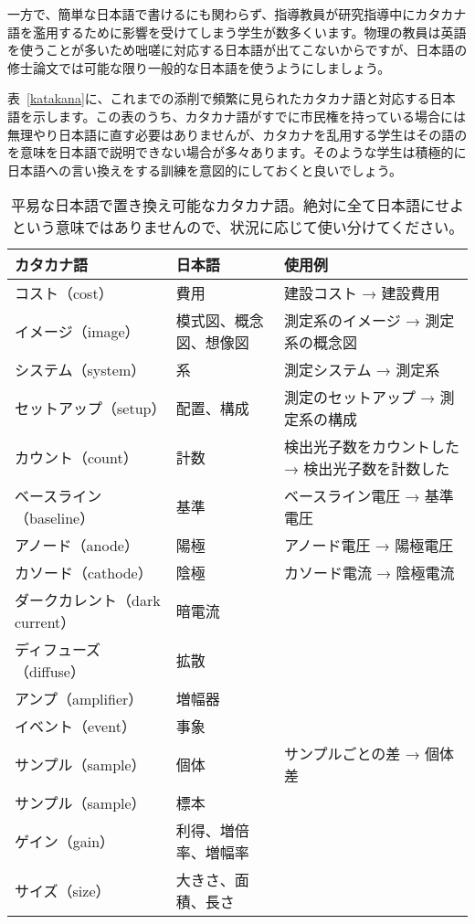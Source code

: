 一方で、簡単な日本語で書けるにも関わらず、指導教員が研究指導中にカタカナ語を濫用するために影響を受けてしまう学生が数多くいます。物理の教員は英語を使うことが多いため咄嗟に対応する日本語が出てこないからですが、日本語の修士論文では可能な限り一般的な日本語を使うようにしましょう。

表~\ref{katakana}に、これまでの添削で頻繁に見られたカタカナ語と対応する日本語を示します。この表のうち、カタカナ語がすでに市民権を持っている場合には無理やり日本語に直す必要はありませんが、カタカナを乱用する学生はその語のを意味を日本語で説明できない場合が多々あります。そのような学生は積極的に日本語への言い換えをする訓練を意図的にしておくと良いでしょう。

\begin{table}
  \centering
  \caption{平易な日本語で置き換え可能なカタカナ語。絶対に全て日本語にせよという意味ではありませんので、状況に応じて使い分けてください。}
  \begin{tabular}{lll}
    \hline
    カタカナ語 & 日本語 & 使用例 \\
    \hline
    コスト（cost） & 費用 & 建設コスト → 建設費用 \\
    イメージ（image） & 模式図、概念図、想像図 & 測定系のイメージ → 測定系の概念図 \\
    システム（system） & 系 & 測定システム → 測定系 \\
    セットアップ（setup） & 配置、構成 & 測定のセットアップ → 測定系の構成 \\
    カウント（count） & 計数 & 検出光子数をカウントした → 検出光子数を計数した \\
    ベースライン（baseline） & 基準 & ベースライン電圧 → 基準電圧 \\
    アノード（anode） & 陽極 & アノード電圧 → 陽極電圧 \\
    カソード（cathode） & 陰極 & カソード電流 → 陰極電流 \\
    ダークカレント（dark current） & 暗電流 & \\
    ディフューズ（diffuse） & 拡散 & \\
    アンプ（amplifier） & 増幅器 & \\
    イベント（event） & 事象 & \\
    サンプル（sample） & 個体 & サンプルごとの差 → 個体差 \\
    サンプル（sample） & 標本 & \\
    ゲイン（gain） & 利得、増倍率、増幅率 & \\
    サイズ（size） & 大きさ、面積、長さ & \\

\end{tabular}
\end{table}
